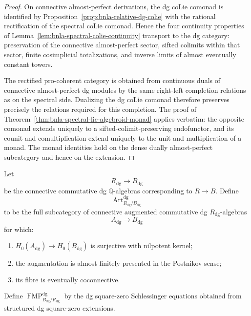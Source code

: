 \begin{proof}
On connective almost-perfect derivations, the dg coLie comonad is identified
by Proposition~\ref{prop:bnla-relative-dg-colie} with the rational
rectification of the spectral coLie comonad.  Hence the four continuity
properties of Lemma~\ref{lem:bnla-spectral-colie-continuity} transport to the
dg category: preservation of the connective almost-perfect sector, sifted
colimits within that sector, finite cosimplicial totalizations, and inverse
limits of almost eventually constant towers.

The rectified pro-coherent category is obtained from continuous duals of
connective almost-perfect dg modules by the same right-left completion
relations as on the spectral side.  Dualizing the dg coLie comonad therefore
preserves precisely the relations required for this completion.  The proof of
Theorem~\ref{thm:bnla-spectral-lie-algebroid-monad} applies verbatim: the
opposite comonad extends uniquely to a sifted-colimit-preserving endofunctor,
and its counit and comultiplication extend uniquely to the unit and
multiplication of a monad.  The monad identities hold on the dense dually
almost-perfect subcategory and hence on the extension.
\end{proof}

\begin{definition}
\label{def:bnla-rational-dg-artinian}
Let
\[
    R_{\mathrm{dg}}\longrightarrow B_{\mathrm{dg}}
\]
be the connective commutative dg $\mathbb Q$-algebras corresponding to
$R\to B$.  Define
\[
    \operatorname{Art}^{\mathrm{dg}}_{R_{\mathrm{dg}}/B_{\mathrm{dg}}}
\]
to be the full subcategory of connective augmented commutative dg
$R_{\mathrm{dg}}$-algebras
\[
    A_{\mathrm{dg}}\longrightarrow B_{\mathrm{dg}}
\]
for which:
\begin{enumerate}
    \item $H_0(A_{\mathrm{dg}})\to H_0(B_{\mathrm{dg}})$ is surjective with
    nilpotent kernel;
    \item the augmentation is almost finitely presented in the Postnikov
    sense;
    \item its fibre is eventually coconnective.
\end{enumerate}
Define
$\operatorname{FMP}^{\mathrm{dg}}_{B_{\mathrm{dg}}/R_{\mathrm{dg}}}$
by the dg square-zero Schlessinger equations obtained from structured dg
square-zero extensions.
\end{definition}

